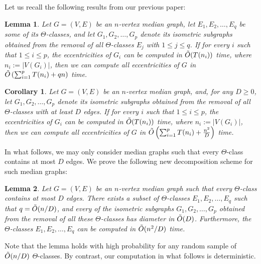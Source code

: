 \documentclass[11pt,letterpaper]{article}
\newtheorem{lemma}{Lemma}
\newtheorem{corollary}{Corollary}
\begin{document}
Let us recall the following results from our previous paper:

\begin{lemma}
    Let $G=(V,E)$ be an $n$-vertex median graph, let $E_1,E_2,\ldots,E_q$ be some of its $\Theta$-classes, and let $G_1,G_2,\ldots,G_p$ denote its isometric subgraphs obtained from the removal of all $\Theta$-classes $E_j$ with $1 \le j \le q$. If for every $i$ such that $1 \le i \le p$, the eccentricities of $G_i$ can be computed in $\Tilde{O}(T(n_i))$ time, where $n_i := |V(G_i)|$, then we can compute all eccentricities of $G$ in $\Tilde{O}\left(\sum_{i=1}^pT(n_i) + qn\right)$ time.
\end{lemma}

\begin{corollary}
    Let $G=(V,E)$ be an $n$-vertex median graph, and, for any $D \ge 0$, let $G_1,G_2,\ldots,G_p$ denote its isometric subgraphs obtained from the removal of all $\Theta$-classes with at least $D$ edges. If for every $i$ such that $1 \le i \le p$, the eccentricities of $G_i$ can be computed in $\Tilde{O}(T(n_i))$ time, where $n_i := |V(G_i)|$, then we can compute all eccentricities of $G$ in $\Tilde{O}\left(\sum_{i=1}^pT(n_i) + \frac{n^2}D\right)$ time.
\end{corollary}

In what follows, we may only consider median graphs such that every $\Theta$-class contains at most $D$ edges.
We prove the following new decomposition scheme for such median graphs:

\begin{lemma}
    Let $G=(V,E)$ be an $n$-vertex median graph such that every $\Theta$-class contains at most $D$ edges.
    There exists a subset of $\Theta$-classes $E_1,E_2,\ldots,E_q$ such that $q = \Tilde{O}(n/D)$, and every of the isometric subgraphs $G_1,G_2,\ldots,G_p$ obtained from the removal of all these $\Theta$-classes has diameter in $\Tilde{O}(D)$.
    Furthermore, the $\Theta$-classes $E_1,E_2,\ldots,E_q$ can be computed in $\Tilde{O}(n^2/D)$ time.
\end{lemma}

Note that the lemma holds with high probability for any random sample of $\Tilde{O}(n/D)$ $\Theta$-classes.
By contrast, our computation in what follows is deterministic.
\end{document}

